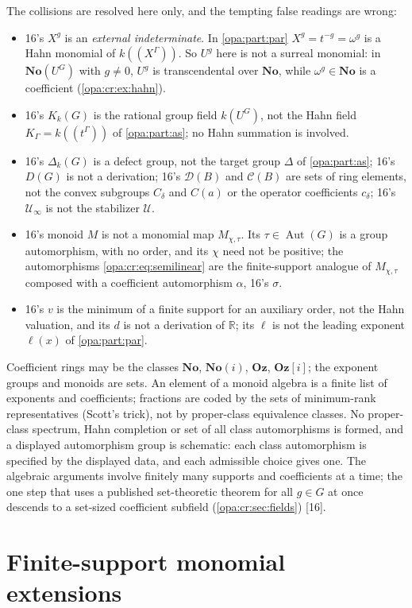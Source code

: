 \documentclass[11pt,oneside]{article}
\numberwithin{equation}{section}
\theoremstyle{definition}
\theoremstyle{remark}
\newcommand{\No}{\mathbf{No}}
\newcommand{\Oz}{\mathbf{Oz}}
\newcommand{\Og}{\mathbf{Oz}[i]}
\newcommand{\SC}{\mathbf{No}(i)}
\newcommand{\R}{\mathbb R}
\newcommand{\UU}{\mathcal U}
\newcommand{\Aut}{\operatorname{Aut}}
\newcommand{\Hahn}[2]{#1((t^{#2}))}
\newcommand{\src}[1]{\textup{\textsf{\small[#1]}}}
\begin{document}
The collisions are resolved here only, and the tempting false readings are wrong:
\begin{itemize}[itemsep=1pt]
\item 16's $X^g$ is an \emph{external indeterminate}. In \cref{opa:part:par} $X^g=t^{-g}=\omega^g$ is a
Hahn monomial of $k((X^\Gamma))$. So $U^g$ here is not a surreal monomial: in $\No(U^G)$ with $g\ne0$,
$U^g$ is transcendental over $\No$, while $\omega^g\in\No$ is a coefficient (\cref{opa:cr:ex:hahn}).
\item 16's $K_k(G)$ is the rational group field $k(U^G)$, not the Hahn field $K_\Gamma=\Hahn k\Gamma$ of
\cref{opa:part:as}; no Hahn summation is involved.
\item 16's $\Delta_k(G)$ is a defect group, not the target group $\Delta$ of \cref{opa:part:as}; 16's $D(G)$ is
not a derivation; 16's $\mathcal D(B)$ and $\mathcal C(B)$ are sets of ring elements, not the convex
subgroups $C_\delta$ and $C(a)$ or the operator coefficients $c_\delta$; 16's $\mathcal U_\infty$ is not the
stabilizer $\UU$.
\item 16's monoid $M$ is not a monomial map $M_{\chi,\tau}$. Its $\tau\in\Aut(G)$ is a group automorphism,
with no order, and its $\chi$ need not be positive; the automorphisms \eqref{opa:cr:eq:semilinear} are the
finite-support analogue of $M_{\chi,\tau}$ composed with a coefficient automorphism $\alpha$, 16's $\sigma$.
\item 16's $v$ is the minimum of a finite support for an auxiliary order, not the Hahn valuation, and its
$d$ is not a derivation of $\R$; its $\ell$ is not the leading exponent $\ell(x)$ of \cref{opa:part:par}.
\end{itemize}
Coefficient rings may be the classes $\No$, $\SC$, $\Oz$, $\Og$; the exponent groups and monoids are sets.
An element of a monoid algebra is a finite list of exponents and coefficients; fractions are coded by the
sets of minimum-rank representatives (Scott's trick), not by proper-class equivalence classes. No
proper-class spectrum, Hahn completion or set of all class automorphisms is formed, and a displayed
automorphism group is schematic: each class automorphism is specified by the displayed data, and each
admissible choice gives one. The algebraic arguments involve finitely many supports and coefficients at a
time; the one step that uses a published set-theoretic theorem for all $g\in G$ at once descends to a
set-sized coefficient subfield (\cref{opa:cr:sec:fields}) \src{16}.

\section{Finite-support monomial extensions}\label{opa:cr:sec:prelim}
\end{document}
